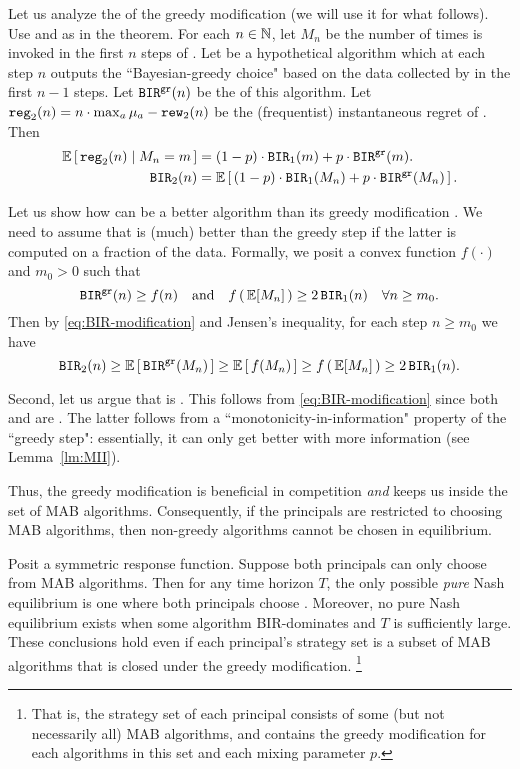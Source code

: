 Let us analyze the \BIR of the greedy modification (we will use it for what follows). Use \alg[1] and \alg[2] as in the theorem. For each $n\in\mathbb{N}$, let $M_n$ be the number of times \alg[1] is invoked in the first $n$ steps of \alg[2]. Let \alggr be a hypothetical algorithm which at each step $n$ outputs the ``Bayesian-greedy choice" based on the data collected by \alg[1] in the first $n-1$ steps. Let $\mathtt{BIR}^{\texttt{gr}}(n)$ be the \BIR of this algorithm. Let
    $\mathtt{reg}_2(n) = n\cdot \max_a \mu_a - \mathtt{rew}_2(n)$
be the (frequentist) instantaneous regret of \alg[2]. Then
\begin{align}
\E\sbr{ \mathtt{reg}_2(n) \mid M_n = m}
    &= (1-p) \cdot \BIR_1(m) + p \cdot \BIRgr(m). \nonumber \\
\BIR_2(n)
    &= \E\sbr{ (1-p) \cdot \BIR_1(M_n) + p \cdot \BIRgr(M_n) }.
    \label{eq:BIR-modification}
\end{align}

Let us show how \alg[1] can be a better algorithm than its greedy modification \alg[2]. We need to assume that \alg[1] is (much) better than the greedy step \alggr if the latter is computed on a fraction of the data. Formally, we posit a convex function $f(\cdot)$ and $m_0>0$ such that
\[ \BIRgr(n) \geq f(n)
    \quad\text{and}\quad
    f\rbr{\E[M_n]} \geq 2\, \BIR_1(n) \quad \forall n\geq m_0 .  \]
Then by \eqref{eq:BIR-modification} and Jensen's inequality, for each step $n\geq m_0$ we have
\[\BIR_2(n)
    \geq  \E\sbr{ \BIRgr(M_n) }
    \geq \E\sbr{ f(M_n) }
    \geq f\rbr{ \E[M_n] }
    \geq 2\,\BIR_1(n). \]

Second, let us argue that \alg[2] is \bmonotone. This follows from \eqref{eq:BIR-modification} since both \alg[1] and \alggr are \bmonotone. The latter follows from a ``monotonicity-in-information" property of the ``greedy step": essentially, it can only get better with more information
(see Lemma~\ref{lm:MII}).

Thus, the greedy modification is beneficial in competition \emph{and} keeps us inside the set of \bmonotone MAB algorithms. Consequently, if the principals are restricted to choosing \bmonotone MAB algorithms, then non-greedy algorithms cannot be chosen in equilibrium.

\begin{corollary}\label{cor:random-greedy}
Posit a symmetric \HardMaxRandom response function. Suppose both principals can only choose from \bmonotone MAB algorithms. Then for any time horizon $T$, the only possible \emph{pure} Nash equilibrium is one where both principals choose \DynGreedy. Moreover, no pure Nash equilibrium exists when some algorithm BIR-dominates \DynGreedy and $T$ is sufficiently large.
These conclusions hold even if each principal's strategy set is a subset of \bmonotone MAB algorithms that is closed under the greedy modification.%
\footnote{That is, the strategy set of each principal consists of some (but not necessarily all) \bmonotone MAB algorithms, and contains the greedy modification for each algorithms in this set and each mixing parameter $p$.}
\end{corollary}

